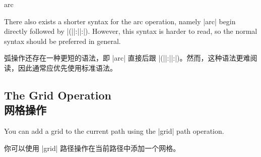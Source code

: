 \begin{pathoperation}{arc}{}
\begin{codeexample}[]
\end{codeexample}

    There also exists a shorter syntax for the arc operation, namely |arc|
    begin directly followed by
    |(||:||:|). However, this
    syntax is harder to read, so the normal syntax should be preferred in
    general.

    弧操作还存在一种更短的语法，即 |arc| 直接后跟 |(||:||:|)。然而，这种语法更难阅读，因此通常应优先使用标准语法。

\end{pathoperation}


\subsection{The Grid Operation\\网格操作}

You can add a grid to the current path using the |grid| path operation.

你可以使用 |grid| 路径操作在当前路径中添加一个网格。


